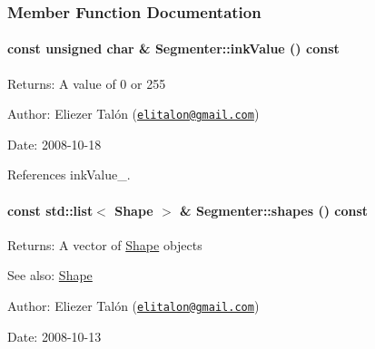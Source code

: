 \subsubsection{Member Function Documentation}
\hypertarget{class_segmenter_e9bc56ddcbe5ea4abb40fcc85e3d9fbe}{
\paragraph[inkValue]{\setlength{\rightskip}{0pt plus 5cm}const unsigned char \& Segmenter::inkValue () const}\hfill}
\label{class_segmenter_e9bc56ddcbe5ea4abb40fcc85e3d9fbe}


\begin{Desc}
\item[Returns:]A value of 0 or 255\end{Desc}
\begin{Desc}
\item[Author:]Eliezer Talón (\href{mailto:elitalon@gmail.com}{\tt elitalon@gmail.com}) \end{Desc}
\begin{Desc}
\item[Date:]2008-10-18 \end{Desc}


References inkValue\_\-.\hypertarget{class_segmenter_7ddded12f26e94e6f5cba2752d2c4142}{
\paragraph[shapes]{\setlength{\rightskip}{0pt plus 5cm}const std::list$<$ {\bf Shape} $>$ \& Segmenter::shapes () const}\hfill}
\label{class_segmenter_7ddded12f26e94e6f5cba2752d2c4142}


\begin{Desc}
\item[Returns:]A vector of \hyperlink{class_shape}{Shape} objects\end{Desc}
\begin{Desc}
\item[See also:]\hyperlink{class_shape}{Shape}\end{Desc}
\begin{Desc}
\item[Author:]Eliezer Talón (\href{mailto:elitalon@gmail.com}{\tt elitalon@gmail.com}) \end{Desc}
\begin{Desc}
\item[Date:]2008-10-13 \end{Desc}


